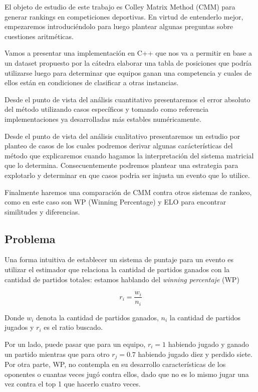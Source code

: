 El objeto de estudio de este trabajo es Colley Matrix Method (CMM) para generar rankings en competiciones deportivas. En virtud de entenderlo mejor, empezaremos introduciéndolo para luego plantear algunas preguntas sobre cuestiones aritméticas.

Vamos a presentar una implementación en C++ que nos va a permitir en base a un dataset propuesto por la cátedra elaborar una tabla de posiciones que podría utilizarse luego para determinar que equipos ganan una competencia y cuales de ellos están en condiciones de clasificar a otras instancias.

Desde el punto de vista del análisis cuantitativo presentaremos el error absoluto del método utilizando casos específicos y tomando como referencia implementaciones ya desarrolladas más estables numéricamente.

Desde el punto de vista del análisis cualitativo presentaremos un estudio por planteo de casos de los cuales podremos derivar algunas carácterísticas del método que explicaremos cuando hagamos la interpretación del sistema matricial que lo determina. Consecuentemente podremos plantear una estrategia para explotarlo y determinar en que casos podria ser injusta un evento que lo utilice.

Finalmente haremos una comparación de CMM contra otros sistemas de rankeo, como en este caso son WP (Winning Percentage) y ELO para encontrar similitudes y diferencias.

\subsection{Problema}
Una forma intuitiva de establecer un sistema de puntaje para un evento es utilizar el estimador que relaciona la cantidad de partidos ganados con la cantidad de partidos totales: estamos hablando del \textit{winning percentaje} (WP)

\begin{equation}
    r_i = \frac{w_i}{n_i}
\end{equation}

Donde $w_i$ denota la cantidad de partidos ganados, $n_i$ la cantidad de partidos jugados y $r_i$ es el ratio buscado.

Por un lado, puede pasar que para un equipo, $r_i = 1$ habiendo jugado y ganado un partido mientras que para otro $r_j = 0.7$ habiendo jugado diez y perdido siete. Por otra parte, WP, no contempla en su desarrollo características de los oponentes o cuantas veces jugó contra ellos, dado que no es lo mismo jugar una vez contra el top 1 que hacerlo cuatro veces.

